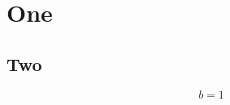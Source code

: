 \documentclass{sn-jnl}
\begin{document}
\section{One}
\snextra
\begin{table}[h]\caption{A table}\end{table}
\begin{appendices}
\section{Two}
\begin{equation}b=1\end{equation}
\end{appendices}
\end{document}
